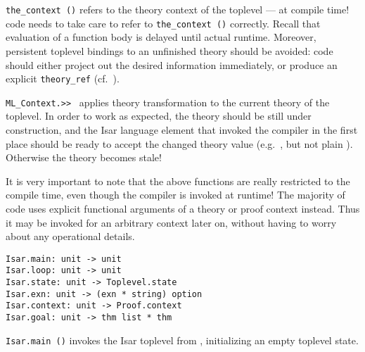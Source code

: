 \begin{isabellebody}
\begin{isamarkuptext}
\begin{description}
  \item \verb|the_context ()| refers to the theory context of the
  {\ML} toplevel --- at compile time!  {\ML} code needs to take care
  to refer to \verb|the_context ()| correctly.  Recall that
  evaluation of a function body is delayed until actual runtime.
  Moreover, persistent {\ML} toplevel bindings to an unfinished theory
  should be avoided: code should either project out the desired
  information immediately, or produce an explicit \verb|theory_ref| (cf.\ ).

  \item \verb|ML_Context.>>|~ applies theory transformation
   to the current theory of the {\ML} toplevel.  In order to
  work as expected, the theory should be still under construction, and
  the Isar language element that invoked the {\ML} compiler in the
  first place should be ready to accept the changed theory value
  (e.g.\ , but not plain ).
  Otherwise the theory becomes stale!

  \end{description}

  It is very important to note that the above functions are really
  restricted to the compile time, even though the {\ML} compiler is
  invoked at runtime!  The majority of {\ML} code uses explicit
  functional arguments of a theory or proof context instead.  Thus it
  may be invoked for an arbitrary context later on, without having to
  worry about any operational details.

  \bigskip

  \begin{mldecls}
  \verb|Isar.main: unit -> unit| \\
  \verb|Isar.loop: unit -> unit| \\
  \verb|Isar.state: unit -> Toplevel.state| \\
  \verb|Isar.exn: unit -> (exn * string) option| \\
  \verb|Isar.context: unit -> Proof.context| \\
  \verb|Isar.goal: unit -> thm list * thm| \\
  \end{mldecls}

  \begin{description}

  \item \verb|Isar.main ()| invokes the Isar toplevel from {\ML},
  initializing an empty toplevel state.


\end{description}
\end{isamarkuptext}
\end{isabellebody}
